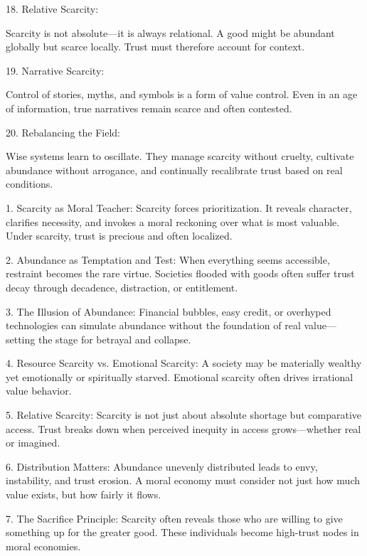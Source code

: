 \documentclass[11pt,oneside]{book}
\begin{document}
18. Relative Scarcity:

Scarcity is not absolute—it is always relational. A good might be abundant globally but scarce locally. Trust must therefore account for context.


19. Narrative Scarcity:

Control of stories, myths, and symbols is a form of value control. Even in an age of information, true narratives remain scarce and often contested.


20. Rebalancing the Field:

Wise systems learn to oscillate. They manage scarcity without cruelty, cultivate abundance without arrogance, and continually recalibrate trust based on real conditions.


1. Scarcity as Moral Teacher: Scarcity forces prioritization. It reveals character, clarifies necessity, and invokes a moral reckoning over what is most valuable. Under scarcity, trust is precious and often localized.



2. Abundance as Temptation and Test: When everything seems accessible, restraint becomes the rare virtue. Societies flooded with goods often suffer trust decay through decadence, distraction, or entitlement.



3. The Illusion of Abundance: Financial bubbles, easy credit, or overhyped technologies can simulate abundance without the foundation of real value—setting the stage for betrayal and collapse.



4. Resource Scarcity vs. Emotional Scarcity: A society may be materially wealthy yet emotionally or spiritually starved. Emotional scarcity often drives irrational value behavior.



5. Relative Scarcity: Scarcity is not just about absolute shortage but comparative access. Trust breaks down when perceived inequity in access grows—whether real or imagined.



6. Distribution Matters: Abundance unevenly distributed leads to envy, instability, and trust erosion. A moral economy must consider not just how much value exists, but how fairly it flows.



7. The Sacrifice Principle: Scarcity often reveals those who are willing to give something up for the greater good. These individuals become high-trust nodes in moral economies.
\end{document}
